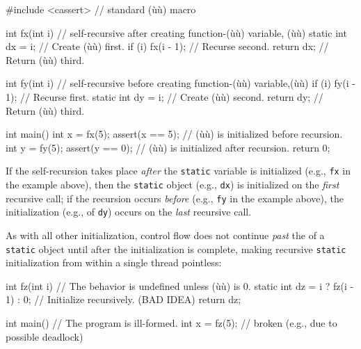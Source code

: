 \begin{emcppshiddenlisting}[emcppsbatch=e2]
#include <cassert>  // standard (ù{}ù) macro
\end{emcppshiddenlisting}
\begin{emcppslisting}[emcppsbatch=e2]
int fx(int i)  // self-recursive after creating function-(ù{}ù) variable, (ù{}ù)
{
    static int dx = i;     // Create (ù{}ù) first.
    if (i) { fx(i - 1); }  // Recurse second.
    return dx;             // Return (ù{}ù) third.
}

int fy(int i)  // self-recursive before creating function-(ù{}ù) variable,(ù{}ù)
{
    if (i) { fy(i - 1); }  // Recurse first.
    static int dy = i;     // Create (ù{}ù) second.
    return dy;             // Return (ù{}ù) third.
}

int main()
{
    int x = fx(5);  assert(x == 5);  // (ù{}ù) is initialized before recursion.
    int y = fy(5);  assert(y == 0);  // (ù{}ù) is initialized after recursion.
    return 0;
}
\end{emcppslisting}

\noindent If the self-recursion takes place \emph{after} the \lstinline!static!
variable is initialized (e.g., \lstinline!fx! in the example above), then the
\lstinline!static! object (e.g., \lstinline!dx!) is initialized on the
\emph{first} recursive call; if the recursion occurs \emph{before}
(e.g., \lstinline!fy! in the example above), the initialization (e.g., of \lstinline!dy!)
occurs on the \emph{last} recursive call.

As with all other initialization, control flow does not continue
\emph{past} the  of a \lstinline!static! object until
after the initialization is complete, making recursive \lstinline!static!
initialization from within a single thread pointless:

\begin{emcppslisting}
int fz(int i)  // The behavior is undefined unless (ù{}ù) is 0.
{
    static int dz = i ? fz(i - 1) : 0;  // Initialize recursively. (BAD IDEA)
    return dz;
}

int main()  // The program is ill-formed.
{
    int x = fz(5);  // broken (e.g., due to possible deadlock)
}
\end{emcppslisting}

